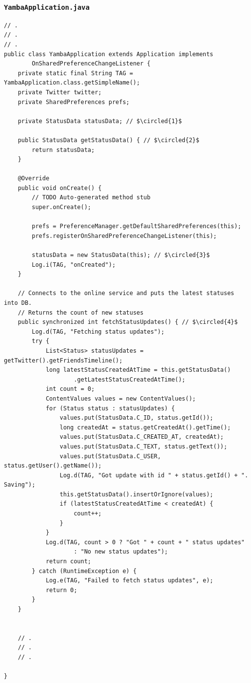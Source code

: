 \begin{frame}
\frametitle{\texttt{YambaApplication.java}}

\lstset{language=java, style=eclipse, breaklines=true, tabsize=2}
\begin{lstlisting}[caption=src/com/artemisa/yamba/YambaApplication.java, basicstyle=\tiny,escapechar= $]
// .
// .
// .
public class YambaApplication extends Application implements
		OnSharedPreferenceChangeListener {
	private static final String TAG = YambaApplication.class.getSimpleName();
	private Twitter twitter;
	private SharedPreferences prefs;

	private StatusData statusData; // $\circled{1}$

	public StatusData getStatusData() { // $\circled{2}$
		return statusData;
	}

	@Override
	public void onCreate() {
		// TODO Auto-generated method stub
		super.onCreate();

		prefs = PreferenceManager.getDefaultSharedPreferences(this);
		prefs.registerOnSharedPreferenceChangeListener(this);

		statusData = new StatusData(this); // $\circled{3}$
		Log.i(TAG, "onCreated");
	}

	// Connects to the online service and puts the latest statuses into DB.
	// Returns the count of new statuses
	public synchronized int fetchStatusUpdates() { // $\circled{4}$
		Log.d(TAG, "Fetching status updates");
		try {
			List<Status> statusUpdates = getTwitter().getFriendsTimeline();
			long latestStatusCreatedAtTime = this.getStatusData()
					.getLatestStatusCreatedAtTime();
			int count = 0;
			ContentValues values = new ContentValues();
			for (Status status : statusUpdates) {
				values.put(StatusData.C_ID, status.getId());
				long createdAt = status.getCreatedAt().getTime();
				values.put(StatusData.C_CREATED_AT, createdAt);
				values.put(StatusData.C_TEXT, status.getText());
				values.put(StatusData.C_USER, status.getUser().getName());
				Log.d(TAG, "Got update with id " + status.getId() + ". Saving");
				this.getStatusData().insertOrIgnore(values);
				if (latestStatusCreatedAtTime < createdAt) {
					count++;
				}
			}
			Log.d(TAG, count > 0 ? "Got " + count + " status updates"
					: "No new status updates");
			return count;
		} catch (RuntimeException e) {
			Log.e(TAG, "Failed to fetch status updates", e);
			return 0;
		}
	}


	// .
	// .
	// .

}

\end{lstlisting}
\end{frame}
